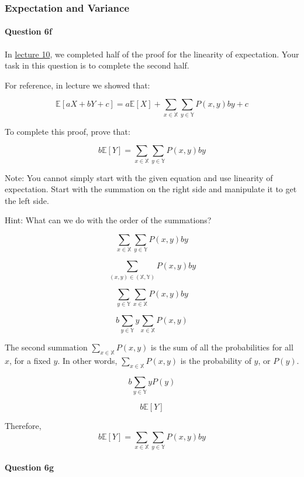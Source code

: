 \documentclass[11pt]{article}
\begin{document}
    \subsubsection{Expectation and Variance}\label{expectation-and-variance}

\paragraph{Question 6f}\label{question-6f}

In \href{http://www.ds100.org/fa18/syllabus\#lecture-week-6}{lecture
10}, we completed half of the proof for the linearity of expectation.
Your task in this question is to complete the second half.

For reference, in lecture we showed that:

\[\mathbb{E}[aX + bY + c] = a\mathbb{E}[X] + \sum_{x \in \mathbb{X}}\sum_{y \in \mathbb{Y}}P(x, y)by + c\]

To complete this proof, prove that:

\[b\mathbb{E}[Y] = \sum_{x \in \mathbb{X}}\sum_{y \in \mathbb{Y}}P(x, y)by\]

Note: You cannot simply start with the given equation and use linearity
of expectation. Start with the summation on the right side and
manipulate it to get the left side.

Hint: What can we do with the order of the summations?

    \[\sum_{x \in \mathbb{X}}\sum_{y \in \mathbb{Y}}P(x, y)by\]

\[\sum_{(x,y) \in (\mathbb{X}, \mathbb{Y})}P(x, y)by\]

\[\sum_{y \in \mathbb{Y}}\sum_{x \in \mathbb{X}}P(x, y)by\]

\[b\sum_{y \in \mathbb{Y}}y\sum_{x \in \mathbb{X}}P(x, y)\]

The second summation \(\sum_{x \in \mathbb{X}}P(x, y)\) is the sum of
all the probabilities for all \(x\), for a fixed \(y\). In other words,
\(\sum_{x \in \mathbb{X}}P(x, y)\) is the probability of \(y\), or
\(P(y)\).

\[b\sum_{y \in \mathbb{Y}}y P(y)\]

\[b\mathbb{E}[Y]\]

Therefore,
\[b\mathbb{E}[Y] = \sum_{x \in \mathbb{X}}\sum_{y \in \mathbb{Y}}P(x, y)by\]

    \paragraph{Question 6g}\label{question-6g}
\end{document}
